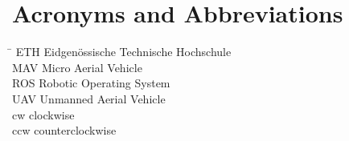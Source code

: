 \section*{Acronyms and Abbreviations}
\begin{tabbing}
 \hspace*{1.6cm}  \= \kill
 ETH \> Eidgenössische Technische Hochschule \\[0.5ex]
 MAV \> Micro Aerial Vehicle \\[0.5ex]
 ROS \> Robotic Operating System \\[0.5ex]
 UAV \> Unmanned Aerial Vehicle \\[0.5ex]
 cw\> clockwise \\[0.5ex]
 ccw\> counterclockwise \\[0.5ex]
\end{tabbing}
